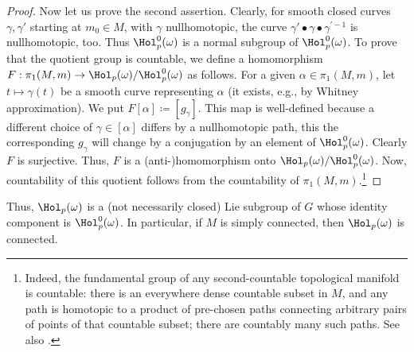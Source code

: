 \begin{proof}
    Now let us prove the second assertion. Clearly, for smooth closed curves $\gamma,\gamma'$ starting at $m_0\in M$, with $\gamma$ nullhomotopic, the curve $\gamma'\bullet\gamma\bullet\gamma^{\prime-1}$ is nullhomotopic, too. Thus $\Hol_p^0(\omega)$ is a normal subgroup of $\Hol_p^0(\omega)$. To prove that the quotient group is countable, we define a homomorphism $F:\pi_1(M,m)\to \Hol_p(\omega)\slash\Hol_p^0(\omega)$ as follows. For a given $\alpha\in\pi_1(M,m)$, let $t\mapsto \gamma(t)$ be a smooth curve representing $\alpha$ (it exists, e.g., by Whitney approximation). We put $F[\alpha]\coloneqq [g_{\gamma}]$. This map is well-defined because a different choice of $\gamma\in [\alpha]$ differs by a nullhomotopic path, this the corresponding $g_\gamma$ will change by a conjugation by an element of $\Hol^0_p(\omega)$. Clearly $F$ is surjective. Thus, $F$ is a (anti-)homomorphism onto $\Hol_p(\omega)\slash \Hol^0_p(\omega)$. Now, countability of this quotient follows from the countability of $\pi_1(M,m)$.\footnote{Indeed, the fundamental group of any second-countable topological manifold is countable: there is an everywhere dense countable subset in $M$, and any path is homotopic to a product of pre-chosen paths connecting arbitrary pairs of points of that countable subset; there are countably many such paths. See also \cite[Prop.~1.16]{Lee}.}
\end{proof}


\begin{rem}
    Thus, $\Hol_p(\omega)$ is a (not necessarily closed) Lie subgroup of $G$ whose identity component is $\Hol_p^0(\omega)$. In particular, if $M$ is simply connected, then $\Hol_p(\omega)$ is connected.
\end{rem}

